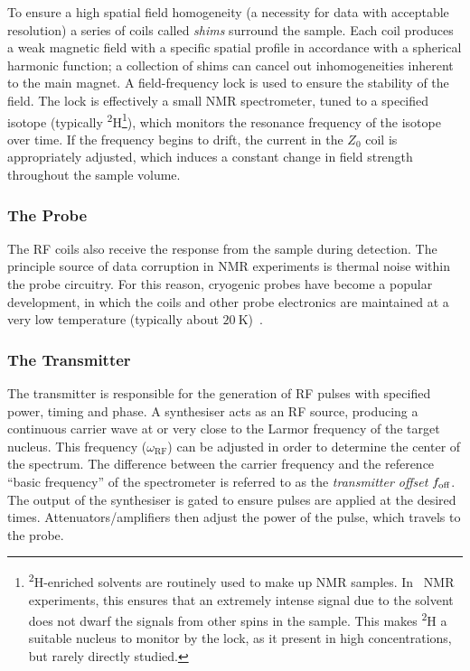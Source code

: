 To ensure a high spatial field homogeneity (a necessity for data with
acceptable resolution) a series of coils called \textit{shims} surround the
sample. Each coil produces a weak magnetic field with a specific spatial
profile in accordance with a spherical harmonic function; a collection of shims
can cancel out
inhomogeneities inherent to the main magnet.
A field-frequency lock is used to ensure the stability of the
field. The lock is effectively a small \ac{NMR} spectrometer, tuned to a
specified isotope (typically \textsuperscript{2}H\footnote{
    \textsuperscript{2}H-enriched solvents are routinely used to make up
    \ac{NMR} samples. In \proton\ \ac{NMR} experiments, this ensures that an
    extremely intense signal due to the solvent does not dwarf the signals from
    other spins in the sample. This makes \textsuperscript{2}H a suitable
    nucleus to monitor by the lock, as it present in high concentrations, but
    rarely directly studied.
}), which monitors the resonance frequency of the isotope over
time. If the frequency begins to drift, the current in the $Z_0$ coil is
appropriately adjusted, which induces a constant change in field strength
throughout the sample volume.

\subsubsection{The Probe}
The \ac{RF} coils also receive the response from the sample during detection.
The principle source of data corruption in \ac{NMR} experiments is thermal
noise within the probe circuitry.  For this reason, cryogenic probes have
become a popular development, in which the coils and other probe electronics
are maintained at a very low temperature (typically about
$\qty{20}{\kelvin}$)~\cite{Kovacs2020}.

\subsubsection{The Transmitter}
The transmitter is responsible for the generation of \ac{RF} pulses
with specified power, timing and phase.
A synthesiser acts as an \ac{RF} source, producing a continuous carrier wave at
or very close to the Larmor frequency of the target nucleus. This frequency
($\omega_{\text{RF}}$) can be adjusted in order to determine the center of the
spectrum. The difference between the carrier frequency and the reference
``basic frequency'' of the spectrometer is referred to as the \emph{transmitter
offset} $f_{\text{off}}$.  The output of the synthesiser is gated to ensure pulses are
applied at the desired times. Attenuators/amplifiers then adjust the power
of the pulse, which travels to the probe.

